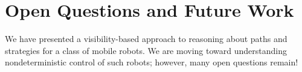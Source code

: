 \documentclass[]{styles/svproc}  %
\begin{document}
%
%
%
%
%
%
%
%

\section{Open Questions and Future Work}

We have presented a visibility-based approach to reasoning about 
paths and strategies for a class of mobile robots. We are moving toward
understanding nondeterministic control of such robots; however, many open
questions remain!
\end{document}
